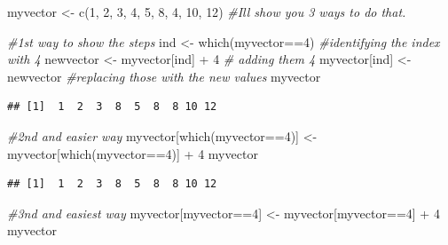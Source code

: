 \documentclass[
]{book}
\newenvironment{Shaded}{\begin{snugshade}}{\end{snugshade}}
\newcommand{\CommentTok}[1]{\textcolor[rgb]{0.56,0.35,0.01}{\textit{#1}}}
\newcommand{\DecValTok}[1]{\textcolor[rgb]{0.00,0.00,0.81}{#1}}
\newcommand{\FunctionTok}[1]{\textcolor[rgb]{0.00,0.00,0.00}{#1}}
\newcommand{\NormalTok}[1]{#1}
\newcommand{\OtherTok}[1]{\textcolor[rgb]{0.56,0.35,0.01}{#1}}
\newcommand{\SpecialCharTok}[1]{\textcolor[rgb]{0.00,0.00,0.00}{#1}}
\theoremstyle{definition}
\theoremstyle{definition}
\theoremstyle{definition}
\theoremstyle{definition}
\theoremstyle{remark}
\begin{document}
\begin{Shaded}
\begin{Highlighting}[]
\NormalTok{myvector }\OtherTok{\textless{}{-}} \FunctionTok{c}\NormalTok{(}\DecValTok{1}\NormalTok{, }\DecValTok{2}\NormalTok{, }\DecValTok{3}\NormalTok{, }\DecValTok{4}\NormalTok{, }\DecValTok{5}\NormalTok{, }\DecValTok{8}\NormalTok{, }\DecValTok{4}\NormalTok{, }\DecValTok{10}\NormalTok{, }\DecValTok{12}\NormalTok{)}
\CommentTok{\#I\textquotesingle{}ll show you 3 ways to do that.}

\CommentTok{\#1st way to show the steps}
\NormalTok{ind }\OtherTok{\textless{}{-}} \FunctionTok{which}\NormalTok{(myvector}\SpecialCharTok{==}\DecValTok{4}\NormalTok{) }\CommentTok{\#identifying the index with 4}
\NormalTok{newvector }\OtherTok{\textless{}{-}}\NormalTok{ myvector[ind] }\SpecialCharTok{+} \DecValTok{4} \CommentTok{\# adding them 4}
\NormalTok{myvector[ind] }\OtherTok{\textless{}{-}}\NormalTok{ newvector }\CommentTok{\#replacing those with the new values}
\NormalTok{myvector}
\end{Highlighting}
\end{Shaded}

\begin{verbatim}
## [1]  1  2  3  8  5  8  8 10 12
\end{verbatim}

\begin{Shaded}
\begin{Highlighting}[]
\CommentTok{\#2nd and easier way}
\NormalTok{myvector[}\FunctionTok{which}\NormalTok{(myvector}\SpecialCharTok{==}\DecValTok{4}\NormalTok{)] }\OtherTok{\textless{}{-}}\NormalTok{ myvector[}\FunctionTok{which}\NormalTok{(myvector}\SpecialCharTok{==}\DecValTok{4}\NormalTok{)] }\SpecialCharTok{+} \DecValTok{4}
\NormalTok{myvector}
\end{Highlighting}
\end{Shaded}

\begin{verbatim}
## [1]  1  2  3  8  5  8  8 10 12
\end{verbatim}

\begin{Shaded}
\begin{Highlighting}[]
\CommentTok{\#3nd and easiest way}
\NormalTok{myvector[myvector}\SpecialCharTok{==}\DecValTok{4}\NormalTok{] }\OtherTok{\textless{}{-}}\NormalTok{ myvector[myvector}\SpecialCharTok{==}\DecValTok{4}\NormalTok{] }\SpecialCharTok{+} \DecValTok{4}
\NormalTok{myvector}
\end{Highlighting}
\end{Shaded}
\end{document}

